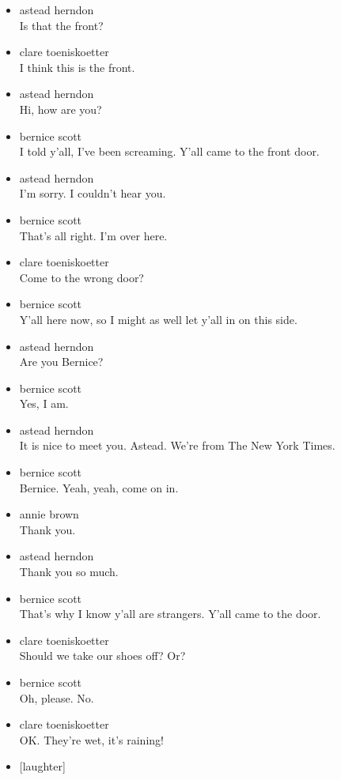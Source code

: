 \begin{itemize}
\item
  astead herndon\\
  Is that the front?
\item
  clare toeniskoetter\\
  I think this is the front.
\item
  astead herndon\\
  Hi, how are you?
\item
  bernice scott\\
  I told y'all, I've been screaming. Y'all came to the front door.
\item
  astead herndon\\
  I'm sorry. I couldn't hear you.
\item
  bernice scott\\
  That's all right. I'm over here.
\item
  clare toeniskoetter\\
  Come to the wrong door?
\item
  bernice scott\\
  Y'all here now, so I might as well let y'all in on this side.
\item
  astead herndon\\
  Are you Bernice?
\item
  bernice scott\\
  Yes, I am.
\item
  astead herndon\\
  It is nice to meet you. Astead. We're from The New York Times.
\item
  bernice scott\\
  Bernice. Yeah, yeah, come on in.
\item
  annie brown\\
  Thank you.
\item
  astead herndon\\
  Thank you so much.
\item
  bernice scott\\
  That's why I know y'all are strangers. Y'all came to the door.
\item
  clare toeniskoetter\\
  Should we take our shoes off? Or?
\item
  bernice scott\\
  Oh, please. No.
\item
  clare toeniskoetter\\
  OK. They're wet, it's raining!
\item
  {[}laughter{]}
\end{itemize}

